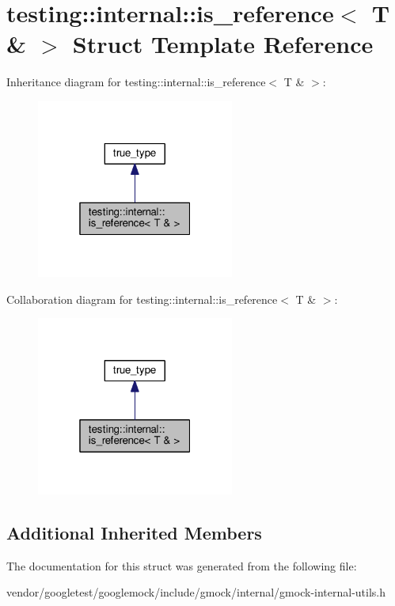 \hypertarget{structtesting_1_1internal_1_1is__reference_3_01T_01_6_01_4}{}\section{testing\+:\+:internal\+:\+:is\+\_\+reference$<$ T \& $>$ Struct Template Reference}
\label{structtesting_1_1internal_1_1is__reference_3_01T_01_6_01_4}


Inheritance diagram for testing\+:\+:internal\+:\+:is\+\_\+reference$<$ T \& $>$\+:\nopagebreak
\begin{figure}[H]
\begin{center}
\leavevmode
\includegraphics[width=184pt]{structtesting_1_1internal_1_1is__reference_3_01T_01_6_01_4__inherit__graph}
\end{center}
\end{figure}


Collaboration diagram for testing\+:\+:internal\+:\+:is\+\_\+reference$<$ T \& $>$\+:\nopagebreak
\begin{figure}[H]
\begin{center}
\leavevmode
\includegraphics[width=184pt]{structtesting_1_1internal_1_1is__reference_3_01T_01_6_01_4__coll__graph}
\end{center}
\end{figure}
\subsection*{Additional Inherited Members}


The documentation for this struct was generated from the following file\+:\begin{DoxyCompactItemize}
\item 
vendor/googletest/googlemock/include/gmock/internal/gmock-\/internal-\/utils.\+h\end{DoxyCompactItemize}
